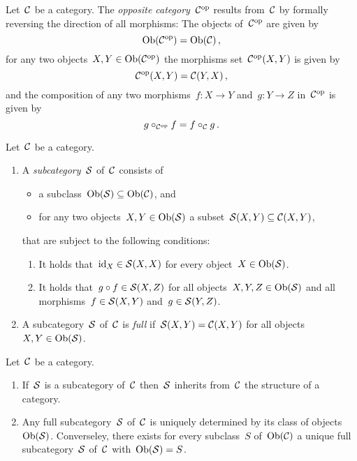 \begin{definition}
  Let~$\mathcal{C}$ be a category.
  The \emph{opposite category}~$\mathcal{C}^{\mathrm{op}}$ results from~$\mathcal{C}$ by formally reversing the direction of all morphisms:
  The objects of~$\mathcal{C}^{\mathrm{op}}$ are given by
  \[
      \operatorname{Ob}(\mathcal{C}^{\mathrm{op}})
    = \operatorname{Ob}(\mathcal{C}) \,,
  \]
  for any two objects~$X, Y \in \operatorname{Ob}(\mathcal{C}^{\mathrm{op}})$ the morphisms set~$\mathcal{C}^{\mathrm{op}}(X,Y)$ is given by
  \[
      \mathcal{C}^{\mathrm{op}}(X,Y)
    = \mathcal{C}(Y,X) \,,
  \]
  and the composition of any two morphisms~$f \colon X \to Y$ and~$g \colon Y \to Z$ in~$\mathcal{C}^{\mathrm{op}}$ is given by
  \[
      g \circ_{\mathcal{C}^{\mathrm{op}}} f
    = f \circ_{\mathcal{C}} g \,.
  \]
\end{definition}


\begin{definition*}
  Let~$\mathcal{C}$ be a category.
  \begin{enumerate}
    \item 
      A \emph{subcategory}~$\mathcal{S}$ of~$\mathcal{C}$ consists of
      \begin{itemize}
        \item
          a subclass~$\operatorname{Ob}(\mathcal{S}) \subseteq \operatorname{Ob}(\mathcal{C})$, and
        \item
          for any two objects~$X, Y \in \operatorname{Ob}(\mathcal{S})$ a subset~$\mathcal{S}(X,Y) \subseteq \mathcal{C}(X,Y)$,
      \end{itemize}
      that are subject to the following conditions:
      \begin{enumerate}[label=(S\arabic*)]
        \item
          It holds that~$\operatorname{id}_X \in \mathcal{S}(X,X)$ for every object~$X \in \operatorname{Ob}(\mathcal{S})$.
        \item
          It holds that~$g \circ f \in \mathcal{S}(X,Z)$ for all objects~$X, Y, Z \in \operatorname{Ob}(\mathcal{S})$ and all morphisms~$f \in \mathcal{S}(X,Y)$ and~$g \in \mathcal{S}(Y,Z)$.
      \end{enumerate}
    \item
      A subcategory~$\mathcal{S}$ of~$\mathcal{C}$ is \emph{full} if~$\mathcal{S}(X,Y) = \mathcal{C}(X,Y)$ for all objects~$X, Y \in \operatorname{Ob}(\mathcal{S})$.
  \end{enumerate}
\end{definition*}


\begin{remark*}
  Let~$\mathcal{C}$ be a category.
  \begin{enumerate}
    \item
      If~$\mathcal{S}$ is a subcategory of~$\mathcal{C}$ then~$\mathcal{S}$ inherits from~$\mathcal{C}$ the structure of a category.
    \item
      Any full subcategory~$\mathcal{S}$ of~$\mathcal{C}$ is uniquely determined by its class of objects~$\operatorname{Ob}(\mathcal{S})$.
      Converseley, there exists for every subclass~$S$ of~$\operatorname{Ob}(\mathcal{C})$ a unique full subcategory~$\mathcal{S}$ of~$\mathcal{C}$ with~$\operatorname{Ob}(\mathcal{S}) = S$.
  \end{enumerate}
\end{remark*}






